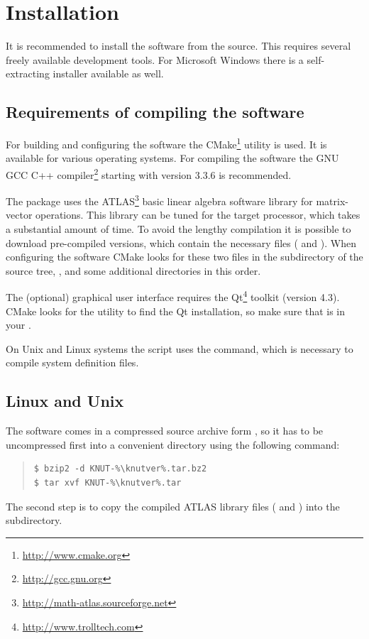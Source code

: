 \documentclass[10pt,a4paper]{ddedoc}
\begin{document}
\section{Installation}

It is recommended to install the software from the source. This requires several freely
available development tools. For Microsoft Windows there is a self-extracting installer
available as well.

\subsection{Requirements of compiling the software}

For building and configuring the software the CMake\footnote{\url{http://www.cmake.org}}
utility is used. It is available for various operating systems. For compiling 
the software the GNU GCC C++ compiler\footnote{\url{http://gcc.gnu.org}} starting with 
version 3.3.6 is recommended.

The package uses the ATLAS\footnote{\url{http://math-atlas.sourceforge.net}}
basic linear algebra software library for matrix-vector operations. This library can be
tuned for the target processor, which takes a substantial amount of time.
To avoid the lengthy compilation it is possible to download
pre-compiled versions, which contain the necessary files ( and
). When configuring the software CMake looks for these two files
in the  subdirectory of the source tree, ,  
and some additional directories in this order.

The (optional) graphical user interface requires the Qt\footnote{\url{http://www.trolltech.com}} 
toolkit (version 4.3). CMake looks for the  utility to find the Qt
installation, so make sure that  is in your .

On Unix and Linux systems the  script uses
the  command, which is necessary to compile system definition files.

\subsection{Linux and Unix}

The software comes in a compressed source archive form
, so it has to be uncompressed first into a
convenient directory using the following command:
{ \small \begin{quote} \begin{lstlisting}[basicstyle=\ttfamily,frame=single]
$ bzip2 -d KNUT-%\knutver%.tar.bz2
$ tar xvf KNUT-%\knutver%.tar
\end{lstlisting} \end{quote} } \noindent
The second step is to copy the compiled ATLAS library files (
and ) into the
 subdirectory.
\end{document}
